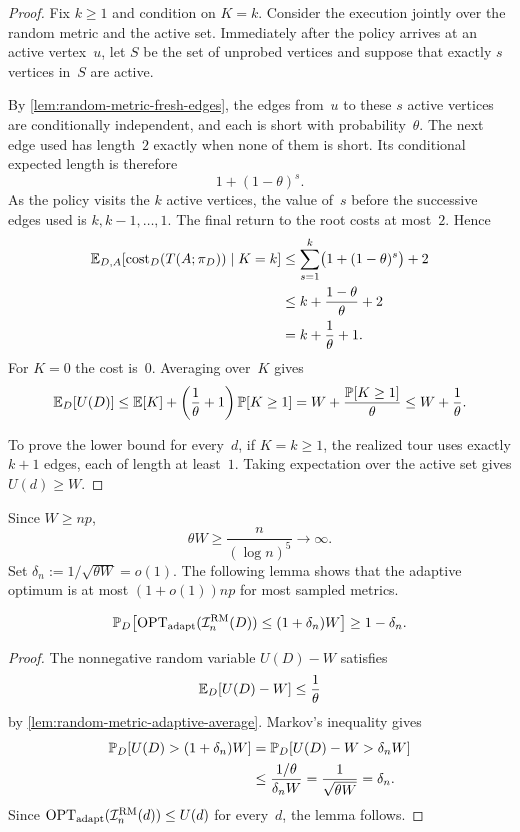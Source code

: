 \documentclass[12pt,a4paper,oneside]{report}
\begin{document}
\begin{proof}
Fix $k\ge1$ and condition on $K=k$.  Consider the execution jointly over
the random metric and the active set.  Immediately after the policy
arrives at an active vertex~$u$, let $S$ be the set of unprobed vertices and
suppose that exactly $s$ vertices in~$S$ are active.

By \cref{lem:random-metric-fresh-edges}, the edges from~$u$ to these $s$
active vertices are conditionally independent, and each is short with
probability~$\theta$.  The next edge used has length~$2$ exactly when
none of them is short.  Its conditional expected length is therefore
\[
    1+(1-\theta)^s.
\]
As the policy visits the $k$ active vertices, the value of~$s$ before the
successive edges used is $k,k-1,\ldots,1$.  The final return to the root
costs at most~$2$.  Hence
\begin{align*}
    \E_{D,A}[\cost_D(T(A;\pi_D))\mid K=k]
    &\le
    \sum_{s=1}^k\bigl(1+(1-\theta)^s\bigr)+2\\
    &\le
    k+\frac{1-\theta}{\theta}+2\\
    &=
    k+\frac1\theta+1.
\end{align*}
For $K=0$ the cost is~$0$.  Averaging over~$K$ gives
\[
    \E_D[U(D)]
    \le \E[K]
       +\left(\frac1\theta+1\right)\P[K\ge1]
    =W+\frac{\P[K\ge1]}{\theta}
    \le W+\frac1\theta.
\]

To prove the lower bound for every~$d$, if $K=k\ge1$, the realized tour uses exactly
$k+1$ edges, each of length at least~$1$.  Taking expectation over the active
set gives $U(d)\ge W$.
\end{proof}

Since $W\ge np$,
\[
    \theta W\ge\frac{n}{(\log n)^5}\longrightarrow\infty.
\]
Set $\delta_n:=1/\sqrt{\theta W}=o(1)$.  The following lemma shows that the
adaptive optimum is at most $(1+o(1))np$ for most sampled metrics.

\begin{lemma}
\label{lem:random-metric-adaptive-whp}
\[
    \P_D\bigl[
        \optadapt(\mathcal{I}_n^{\mathrm{RM}}(D))
        \le(1+\delta_n)W
    \bigr]
    \ge1-\delta_n.
\]
\end{lemma}

\begin{proof}
The nonnegative random variable $U(D)-W$ satisfies
\[
    \E_D[U(D)-W]\le\frac1\theta
\]
by \cref{lem:random-metric-adaptive-average}.  Markov's inequality gives
\begin{align*}
    \P_D[U(D)>(1+\delta_n)W]
    &=
    \P_D[U(D)-W>\delta_nW]\\
    &\le
    \frac{1/\theta}{\delta_nW}
    =
    \frac1{\sqrt{\theta W}}
    =
    \delta_n.
\end{align*}
Since $\optadapt(\mathcal{I}_n^{\mathrm{RM}}(d))\le U(d)$ for every~$d$,
the lemma follows.
\end{proof}
\end{document}
